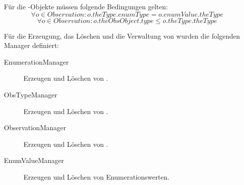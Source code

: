 Für die -Objekte müssen folgende Bedingungen gelten:
\begin{equation}\forall o \in Observation: o.theType.enumType = o.enumValue.theType
\end{equation}
\begin{equation}\forall o \in Observation: o.theObsObject.type \leq o.theType.theType
\end{equation}

Für die Erzeugung, das Löschen und die Verwaltung von  wurden die folgenden Manager definiert:
\begin{description}
\item[EnumerationManager] Erzeugen und Löschen von .
\item[ObsTypeManager] Erzeugen und Löschen von .
\item[ObservationManager] Erzeugen und Löschen von .
\item[EnumValueManager] Erzeugen und Löschen von Enumerationswerten.
\end{description}
